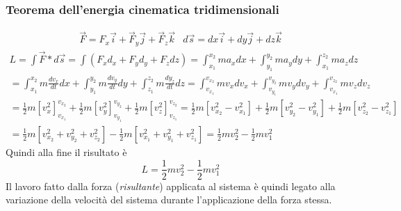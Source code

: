 \documentclass{book}
\begin{document}
\subsubsection{Teorema dell'energia cinematica tridimensionali}
\begin{eqnarray*}
	\vec{F}=F_x\vec{i}+\vec{F}_y\vec{j}+\vec{F}_z\vec{k}
	& d\vec{s}=dx\vec{i}+dy\vec{j}+dz\vec{k}
\end{eqnarray*}
\begin{eqnarray*}
	L=\int \vec{F}*d\vec{s}=\int
	\left(F_xd_x+F_yd_y+F_zdz\right)=\int_{x_1}^{x_2}ma_xdx+\int_{y_1}^{y_2}
	ma_ydy+\int_{x_1}^{z_2}ma_zdz\\ = \int_{x_1}^{x_2}m\frac{dv_x}{dt}dx+
	\int_{y_1}^{y_2}m\frac{dv_y}{dt}dy+\int_{z_1}^{z_2}m\frac{dy_z}{dt}dz=
	\int_{v_{x_1}}^{v_{x_2}}mv_xdv_x+\int_{v_{y_1}}^{v_{y_2}} mv_ydv_y
	+\int_{v_{x_1}}^{v_{z_2}}mv_zdv_z\\
	=\frac{1}{2}m\left[v_x^2\right]_{v_{x_1}}^{v_{x_2}}+ 
	\frac{1}{2}m\left[v_y^2\right]_{v_{y_1}}^{v_{y_2}}+\frac{1}{2}m
	\left[v_z^2\right]_{v_{z_1}}^{v_{z_2}}=
	\frac{1}{2}m\left[v_{x_2}^2-v_{x_1}^2\right]+
	\frac{1}{2}m\left[v_{y_2}^2-v_{y_1}^2\right]+
	\frac{1}{2}m\left[v_{z_2}^2-v_{z_1}^2\right]\\
	=\frac{1}{2}m\left[v_{x_2}^2+v_{y_2}^2+v_{z_2}^2\right]
	-\frac{1}{2}m\left[v_{x_1}^2+v_{y_1}^2+v_{z_1}^2\right]=\frac{1}{2}mv_2^2
	-\frac{1}{2}mv_1^2
\end{eqnarray*}
Quindi alla fine il risultato è 
\begin{equation*}
	\boxed{L=\frac{1}{2}mv_2^2
	-\frac{1}{2}mv_1^2}
\end{equation*}
Il lavoro fatto dalla forza ({\it risultante}) applicata al sistema è quindi
legato alla variazione della velocità del sistema durante l’applicazione della
forza stessa.
\end{document}
